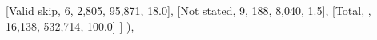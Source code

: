 \documentclass[
  11pt,
  a4paper,
]{article}
\newenvironment{Shaded}{\begin{snugshade}}{\end{snugshade}}
\newcommand{\NormalTok}[1]{\textcolor[rgb]{0.00,0.23,0.31}{#1}}
\newcommand{\StringTok}[1]{\textcolor[rgb]{0.13,0.47,0.30}{#1}}
\begin{document}
\begin{Shaded}
\begin{Highlighting}[]
\NormalTok{                    [}\StringTok{\textquotesingle{}Valid skip\textquotesingle{}}\NormalTok{, }\StringTok{\textquotesingle{}6\textquotesingle{}}\NormalTok{, }\StringTok{\textquotesingle{}2,805\textquotesingle{}}\NormalTok{, }\StringTok{\textquotesingle{}95,871\textquotesingle{}}\NormalTok{, }\StringTok{\textquotesingle{}18.0\textquotesingle{}}\NormalTok{],}
\NormalTok{                    [}\StringTok{\textquotesingle{}Not stated\textquotesingle{}}\NormalTok{, }\StringTok{\textquotesingle{}9\textquotesingle{}}\NormalTok{, }\StringTok{\textquotesingle{}188\textquotesingle{}}\NormalTok{, }\StringTok{\textquotesingle{}8,040\textquotesingle{}}\NormalTok{, }\StringTok{\textquotesingle{}1.5\textquotesingle{}}\NormalTok{],}
\NormalTok{                    [}\StringTok{\textquotesingle{}Total\textquotesingle{}}\NormalTok{, }\StringTok{\textquotesingle{}\textquotesingle{}}\NormalTok{, }\StringTok{\textquotesingle{}16,138\textquotesingle{}}\NormalTok{, }\StringTok{\textquotesingle{}532,714\textquotesingle{}}\NormalTok{, }\StringTok{\textquotesingle{}100.0\textquotesingle{}}\NormalTok{]}
\NormalTok{                ]}
\NormalTok{            ),}
            

\end{Highlighting}
\end{Shaded}
\end{document}

